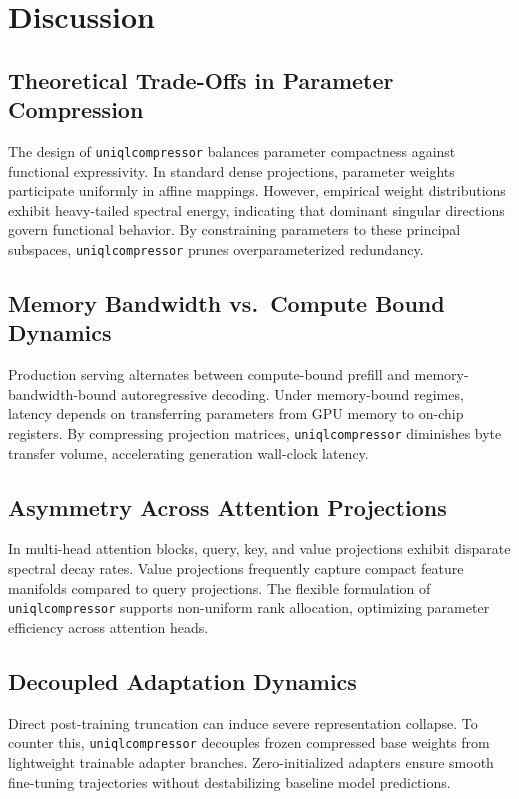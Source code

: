 \section{Discussion}

\subsection{Theoretical Trade-Offs in Parameter Compression}
The design of \texttt{uniqlcompressor} balances parameter compactness against functional expressivity. In standard dense projections, parameter weights participate uniformly in affine mappings. However, empirical weight distributions exhibit heavy-tailed spectral energy, indicating that dominant singular directions govern functional behavior. By constraining parameters to these principal subspaces, \texttt{uniqlcompressor} prunes overparameterized redundancy.

\subsection{Memory Bandwidth vs.\ Compute Bound Dynamics}
Production serving alternates between compute-bound prefill and memory-bandwidth-bound autoregressive decoding. Under memory-bound regimes, latency depends on transferring parameters from GPU memory to on-chip registers. By compressing projection matrices, \texttt{uniqlcompressor} diminishes byte transfer volume, accelerating generation wall-clock latency.

\subsection{Asymmetry Across Attention Projections}
In multi-head attention blocks, query, key, and value projections exhibit disparate spectral decay rates. Value projections frequently capture compact feature manifolds compared to query projections. The flexible formulation of \texttt{uniqlcompressor} supports non-uniform rank allocation, optimizing parameter efficiency across attention heads.

\subsection{Decoupled Adaptation Dynamics}
Direct post-training truncation can induce severe representation collapse. To counter this, \texttt{uniqlcompressor} decouples frozen compressed base weights from lightweight trainable adapter branches. Zero-initialized adapters ensure smooth fine-tuning trajectories without destabilizing baseline model predictions.

